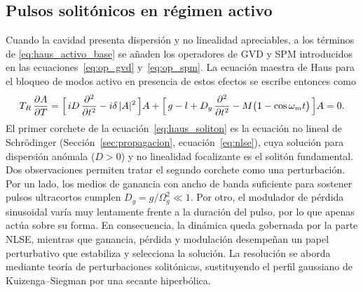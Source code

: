 \subsection{Pulsos solitónicos en régimen activo}
\label{sec:ml_activo_soliton}

Cuando la cavidad presenta dispersión y no linealidad apreciables, a los términos
de \eqref{eq:haus_activo_base} se añaden los operadores de GVD y SPM introducidos
en las ecuaciones~\eqref{eq:op_gvd} y~\eqref{eq:op_spm}. La ecuación maestra de
Haus para el bloqueo de modos activo en presencia de estos efectos se escribe
entonces como
%
\begin{equation}
    T_R\,\frac{\partial A}{\partial T}
    = \Bigl[\,iD\,\frac{\partial^2}{\partial t^2} - i\delta\,|A|^2 \,\Bigr] A
    + \Bigl[\,g - l + D_g\,\frac{\partial^2}{\partial t^2}
      - M\bigl(1-\cos\omega_m t\bigr) \,\Bigr] A = 0.
    \label{eq:haus_soliton}
\end{equation}
%
El primer corchete de la ecuación~\eqref{eq:haus_soliton} es la ecuación no lineal
de Schrödinger (Sección~\ref{sec:propagacion}, ecuación~\eqref{eq:nlse}), cuya
solución para dispersión anómala ($D>0$) y no linealidad focalizante es el solitón
fundamental. Dos observaciones permiten tratar el segundo corchete como una
perturbación. Por un lado, los medios de ganancia con ancho de banda suficiente
para sostener pulsos ultracortos cumplen $D_g=g/\Omega_g^2\ll 1$. Por otro, el
modulador de pérdida sinusoidal varía muy lentamente frente a la duración del
pulso, por lo que apenas actúa sobre su forma. En consecuencia, la dinámica queda
gobernada por la parte NLSE, mientras que ganancia, pérdida y modulación
desempeñan un papel perturbativo que estabiliza y selecciona la solución. La
resolución se aborda mediante teoría de perturbaciones solitónicas, sustituyendo
el perfil gaussiano de Kuizenga--Siegman por una secante hiperbólica.

